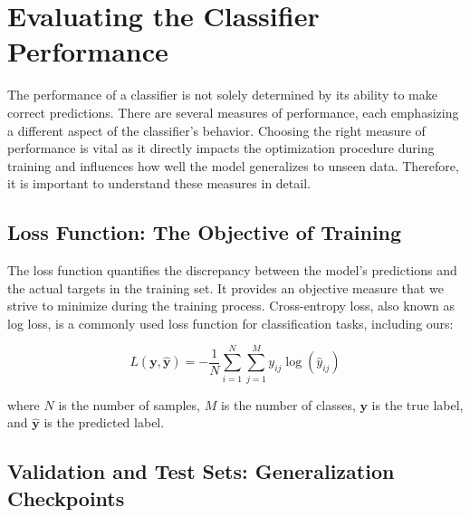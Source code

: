 \section{Evaluating the Classifier Performance}

The performance of a classifier is not solely determined by its ability to make correct predictions. There are several
measures of performance, each emphasizing a different aspect of the classifier's behavior. Choosing the right measure of
performance is vital as it directly impacts the optimization procedure during training and influences how well the model
generalizes to unseen data. Therefore, it is important to understand these measures in detail.

\subsection{Loss Function: The Objective of Training}

The loss function quantifies the discrepancy between the model's predictions and the actual targets in the training set.
It provides an objective measure that we strive to minimize during the training process. Cross-entropy loss, also known
as log loss, is a commonly used loss function for classification tasks, including ours:

\begin{equation}
    L(\mathbf{y}, \mathbf{\hat{y}}) = -\frac{1}{N}\sum_{i=1}^{N}\sum_{j=1}^{M} y_{ij} \log(\hat{y}_{ij})
\end{equation}

where $N$ is the number of samples, $M$ is the number of classes, $\mathbf{y}$ is the true label, and $\mathbf{\hat{y}}$
is the predicted label.

\subsection{Validation and Test Sets: Generalization Checkpoints}

